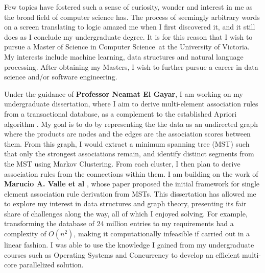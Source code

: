 \documentclass[a4paper,11pt]{article}
\newcommand{\uni}{the University of Victoria}
\newcommand{\program}{Master of Science in Computer Science}
\newcommand{\supervisor}{\textbf{Professor Neamat El Gayar}}
\begin{document}
Few topics have fostered such a sense of curiosity, wonder and interest in me as the broad field of computer science has. The process of seemingly arbitrary words on a screen translating to logic amazed me when I first discovered it, and it still does as I conclude my undergraduate degree. It is for this reason that I wish to pursue a \program\ at \uni. My interests include machine learning, data structures and natural language processing. After obtaining my Masters, I wish to further pursue a career in data science and/or software engineering.


Under the guidance of \supervisor, I am working on my undergraduate dissertation, where I aim to derive multi-element association rules from a transactional database, as a complement to the established Apriori algorithm \cite{apriori}. My goal is to do by representing the the data as an undirected graph where the products are nodes and the edges are the association scores between them. From this graph, I would extract a minimum spanning tree (MST) such that only the strongest associations remain, and identify distinct segments from the MST using Markov Clustering. From each cluster, I then plan to derive association rules from the connections within them. I am building on the work of \textbf{Marucio A. Valle et al} \cite{mst_paper}, whose paper proposed the initial framework for single element association rule derivation from MSTs. This dissertation has allowed me to explore my interest in data structures and graph theory, presenting its fair share of challenges along the way, all of which I enjoyed solving. For example, transforming the database of 24 million entries to my requirements had a complexity of $O(n^2)$, making it computationally infeasible if carried out in a linear fashion. I was able to use the knowledge I gained from my undergraduate courses such as Operating Systems and Concurrency to develop an efficient multi-core parallelized solution.
\end{document}
